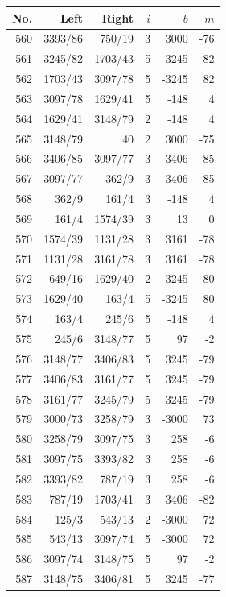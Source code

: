 \documentclass[11pt,a4paper]{article}
\begin{document}
\begin{minipage}[t]{.49\linewidth}\centering\footnotesize\setlength{\tabcolsep}{2pt}\renewcommand{\arraystretch}{1.09}
\begin{tabular*}{\linewidth}{@{}r@{\extracolsep{\fill}}rrrrr@{}}\toprule
No. & Left & Right & $i$ & $b$ & $m$\\\midrule
560 & 3393/86 & 750/19 & 3 & 3000 & -76\\
561 & 3245/82 & 1703/43 & 5 & -3245 & 82\\
562 & 1703/43 & 3097/78 & 5 & -3245 & 82\\
563 & 3097/78 & 1629/41 & 5 & -148 & 4\\
564 & 1629/41 & 3148/79 & 2 & -148 & 4\\
565 & 3148/79 & 40 & 2 & 3000 & -75\\
566 & 3406/85 & 3097/77 & 3 & -3406 & 85\\
567 & 3097/77 & 362/9 & 3 & -3406 & 85\\
568 & 362/9 & 161/4 & 3 & -148 & 4\\
569 & 161/4 & 1574/39 & 3 & 13 & 0\\
570 & 1574/39 & 1131/28 & 3 & 3161 & -78\\
571 & 1131/28 & 3161/78 & 3 & 3161 & -78\\
572 & 649/16 & 1629/40 & 2 & -3245 & 80\\
573 & 1629/40 & 163/4 & 5 & -3245 & 80\\
574 & 163/4 & 245/6 & 5 & -148 & 4\\
575 & 245/6 & 3148/77 & 5 & 97 & -2\\
576 & 3148/77 & 3406/83 & 5 & 3245 & -79\\
577 & 3406/83 & 3161/77 & 5 & 3245 & -79\\
578 & 3161/77 & 3245/79 & 5 & 3245 & -79\\
579 & 3000/73 & 3258/79 & 3 & -3000 & 73\\
580 & 3258/79 & 3097/75 & 3 & 258 & -6\\
581 & 3097/75 & 3393/82 & 3 & 258 & -6\\
582 & 3393/82 & 787/19 & 3 & 258 & -6\\
583 & 787/19 & 1703/41 & 3 & 3406 & -82\\
584 & 125/3 & 543/13 & 2 & -3000 & 72\\
585 & 543/13 & 3097/74 & 5 & -3000 & 72\\
586 & 3097/74 & 3148/75 & 5 & 97 & -2\\
587 & 3148/75 & 3406/81 & 5 & 3245 & -77\\

\end{tabular*}
\end{minipage}
\end{document}
